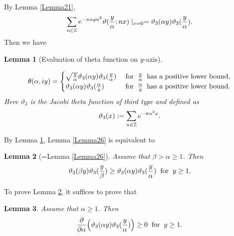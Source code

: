 \documentclass[reqno,english]{amsart}
\newtheorem{lemma}{Lemma}[section]
\newtheorem{open problem}{Open Problem}[section]
\newtheorem{open question}{Open Question}[section]
\newtheorem{open questions on hexagonal lattice}{Open Questions on hexagonal lattice}[section]
\begin{document}
By Lemma \ref{Lemma21},
\begin{equation}\aligned\nonumber
\sum_{n\in\mathbb{Z}} e^{-\pi\alpha yn^2}\vartheta(\frac{y}{\alpha};nx)\mid_{x=0}
=\vartheta_3(\alpha y)\vartheta_3(\frac{y}{\alpha}).
\endaligned\end{equation}
Then we have
\begin{lemma}[Evaluation of theta function on $y$-axis]\label{Lemma28}

 \begin{equation}\aligned\nonumber
\theta(\alpha,iy)=\begin{cases}\sqrt{\frac{y}{\alpha}}\vartheta_3(\alpha y)\vartheta_3(\frac{y}{\alpha})\;&\hbox{for}\;\;\frac{y}{\alpha}\;\;\hbox{has a positive lower bound},\\
\vartheta_3(\alpha y)\vartheta_3(\frac{\alpha}{y})\;&\hbox{for}\;\;\frac{\alpha}{y}\;\;\hbox{has a positive lower bound}.
\end{cases}
\endaligned\end{equation}
Here $\vartheta_3$ is the Jacobi theta function of third type and defined as
 \begin{equation}\aligned\nonumber
\vartheta_3(x):=\sum_{n\in\mathbb{Z}}e^{-\pi n^2 x}.
\endaligned\end{equation}


\end{lemma}


By Lemma \ref{Lemma28}, Lemma \ref{Lemma26} is equivalent to







\begin{lemma}[=Lemma \ref{Lemma26}]\label{Lemma29} Assume that $\beta>\alpha\geq1$. Then
\begin{equation}\aligned\nonumber
\vartheta_3(\beta y)\vartheta_3(\frac{y}{\beta})
\geq
\vartheta_3(\alpha y)\vartheta_3(\frac{y}{\alpha})\;\;\hbox{for}\;\;y\geq1.
\endaligned\end{equation}

\end{lemma}


To prove Lemma \ref{Lemma29}, it suffices to prove that

\begin{lemma}\label{Lemma210} Assume that $\alpha\geq1$. Then
\begin{equation}\aligned\nonumber
\frac{\partial}{\partial \alpha}
\Big(\vartheta_3(\alpha y)\vartheta_3(\frac{y}{\alpha})\Big)\geq0\;\;\hbox{for}\;\;y\geq1.
\endaligned\end{equation}

\end{lemma}
\end{document}

